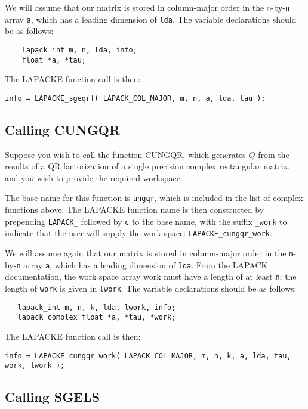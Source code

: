 We will assume that our matrix is stored in column-major order in the {\tt m}-by-{\tt n} 
array {\tt a}, which has a leading dimension of {\tt lda}. The variable declarations should be as follows:

\begin{verbatim}
    lapack_int m, n, lda, info;
    float *a, *tau;
\end{verbatim}

The LAPACKE function call is then:

\begin{verbatim}
info = LAPACKE_sgeqrf( LAPACK_COL_MAJOR, m, n, a, lda, tau );
\end{verbatim}

\subsection{Calling CUNGQR}

Suppose you wish to call the function CUNGQR, which generates $Q$ from the results of a QR factorization of a single precision complex rectangular matrix, and you wish to provide the required workspace.

The base name for this function is {\tt ungqr}, 
which is included in the list of complex functions above. The LAPACKE function name is then constructed by prepending {\tt LAPACK\_} followed by {\tt c} to the base name, 
with the suffix {\tt \_work} to indicate that the user will supply the work space: 
{\tt LAPACKE\_cungqr\_work}.

We will assume again that our matrix is stored in column-major order in the {\tt m}-by-{\tt n} array {\tt a}, which has a leading dimension of {\tt lda}. 
From the LAPACK documentation, the work space array work must have a length of at least {\tt n}; the length of {\tt work} is given in {\tt lwork}. 
The variable declarations should be as follows:

\begin{verbatim}
   lapack_int m, n, k, lda, lwork, info;
   lapack_complex_float *a, *tau, *work;
\end{verbatim}

The LAPACKE function call is then:

\begin{verbatim}
info = LAPACKE_cungqr_work( LAPACK_COL_MAJOR, m, n, k, a, lda, tau, work, lwork );
\end{verbatim}

\subsection{Calling SGELS}

